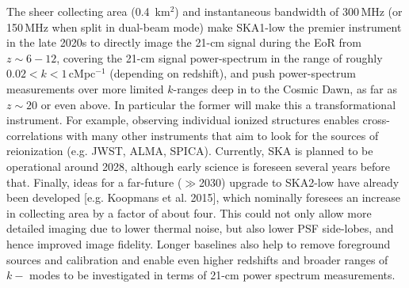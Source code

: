 %
The sheer collecting area (0.4 \,km$^2$) and instantaneous bandwidth of 300\,MHz (or 150\,MHz when split in dual-beam mode) make SKA1-low the premier instrument in the late 2020s to directly image the 21-cm signal during the EoR from $z\sim 6-12$, covering the 21-cm signal power-spectrum in the range of roughly $ 0.02 < k < 1 $\,cMpc$^{-1}$ (depending on redshift), and push power-spectrum measurements over more limited $k$-ranges deep in to the Cosmic Dawn, as far as $z\sim 20$ or even above. In particular the former will make this a transformational instrument. For example, observing individual ionized structures enables cross-correlations with many other instruments that aim to look for the sources of reionization (e.g. JWST, ALMA, SPICA). Currently, SKA is planned to be operational around 2028, although early science is foreseen several years before that.
%
Finally, ideas for a far-future ($\gg$2030) upgrade to SKA2-low have already been developed [e.g. Koopmans et al. 2015], which nominally foresees an increase in collecting area by a factor of about four. This could not only allow more detailed imaging due to lower thermal noise, but also lower PSF side-lobes, and hence improved image fidelity. Longer baselines also help to remove foreground sources and calibration and enable even higher redshifts and broader ranges of $k-$ modes to be investigated in terms of 21-cm power spectrum measurements.



